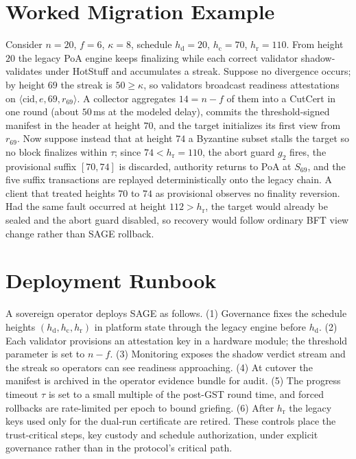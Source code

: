 \documentclass[journal]{IEEEtran}
\theoremstyle{remark}
\begin{document}
\section{Worked Migration Example}
\label{app:example}
Consider $n=20$, $f=6$, $\kappa=8$, schedule $h_{\mathrm{d}}=20$, $h_{\mathrm{c}}=70$,
$h_{\mathrm{r}}=110$. From height $20$ the legacy PoA engine keeps finalizing while each correct
validator shadow-validates under HotStuff and accumulates a streak. Suppose no divergence
occurs; by height $69$ the streak is $50\ge\kappa$, so validators broadcast readiness
attestations on $\langle\mathrm{cid},e,69,r_{69}\rangle$. A collector aggregates $14=n-f$ of them
into a CutCert in one round (about $50$\,ms at the modeled delay), commits the threshold-signed
manifest in the header at height $70$, and the target initializes its first view from $r_{69}$.
Now suppose instead that at height $74$ a Byzantine subset stalls the target so no block
finalizes within $\tau$; since $74<h_{\mathrm{r}}=110$, the abort guard $g_2$ fires, the
provisional suffix $[70,74]$ is discarded, authority returns to PoA at $S_{69}$, and the five
suffix transactions are replayed deterministically onto the legacy chain. A client that treated
heights $70$ to $74$ as provisional observes no finality reversion. Had the same fault occurred at
height $112>h_{\mathrm{r}}$, the target would already be sealed and the abort guard disabled, so
recovery would follow ordinary BFT view change rather than SAGE rollback.

\section{Deployment Runbook}
\label{app:runbook}
A sovereign operator deploys SAGE as follows. (1) Governance fixes the schedule heights
$(h_{\mathrm{d}},h_{\mathrm{c}},h_{\mathrm{r}})$ in platform state through the legacy engine
before $h_{\mathrm{d}}$. (2) Each validator provisions an attestation key in a hardware module;
the threshold parameter is set to $n-f$. (3) Monitoring exposes the shadow verdict stream and
the streak so operators can see readiness approaching. (4) At cutover the manifest is archived in
the operator evidence bundle for audit. (5) The progress timeout $\tau$ is set to a small
multiple of the post-GST round time, and forced rollbacks are rate-limited per epoch to bound
griefing. (6) After $h_{\mathrm{r}}$ the legacy keys used only for the dual-run certificate are
retired. These controls place the trust-critical steps, key custody and schedule authorization,
under explicit governance rather than in the protocol's critical path.
\end{document}
